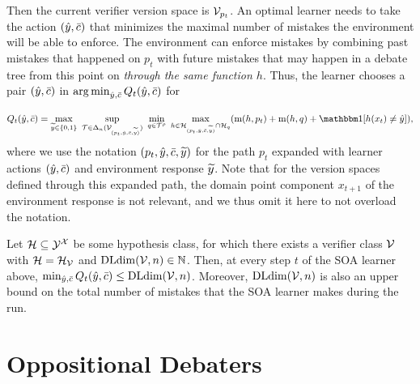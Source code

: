 \documentclass[anon]{alt2027} %
\DeclareMathOperator*{\argmin}{arg\,min}
\begin{document}
Then the current verifier version space is ${\mathcal V}_{p_t}$. 
An optimal learner needs to take the action $({\hat{y}}, \bar{c})$ that minimizes the maximal number of mistakes the environment will be able to enforce. The environment can enforce mistakes by combining past mistakes that happened on $p_t$ with future mistakes that may happen in a debate tree from this point on \emph{through the same function $h$}.
Thus, the learner chooses a pair $({\hat{y}}, \bar{c})$ in $\argmin_{\hy, \sc}Q_t(\hy, \sc)$ for

\[
Q_t(\hy, \sc) = \max_{\vy\in\{0,1\}} ~\sup_{\T\in\Delta_n(\V_{(p_t,\hy, \sc, \vy)})} ~\min_{q\in\T^\rho} ~\max_{h\in \H_{(p_t,\hy, \sc, \vy)}\cap \H_q} (\mi(h, p_t) + \mi(h,q) +\indct[h(x_t) \neq \hy]),
\]
where we use the notation $(p_t,{\hat{y}}, \bar{c}, {\widetilde{y}})$ for the path $p_t$ expanded with learner actions $({\hat{y}}, \bar{c})$ and environment response ${\widetilde{y}}$. 
Note that for the version spaces defined through this expanded path, the domain point component $x_{t+1}$ of the  environment response is not relevant, and we thus omit it here to not overload the notation.

\begin{lemma}\label{lemma:cooperative_deterministic_upperbound}
 Let ${{\mathcal H}}\subseteq {\mathcal Y}^{\mathcal X}$ be some hypothesis class, for which there exists a verifier class ${\mathcal V}$ with ${{\mathcal H}} = {{\mathcal H}}_{\mathcal V}$ and $\mathrm{DLdim}({\mathcal V}, n) \in \mathbb{N}$. Then, at every step $t$ of the SOA learner above, $\min_{{\hat{y}},\bar{c}} Q_t({\hat{y}},\bar{c}) \leq \mathrm{DLdim}({\mathcal V}, n)$. 
  Moreover, $\mathrm{DLdim}({\mathcal V}, n)$ is also an upper bound on the total number of mistakes that the SOA learner makes during the run.
\end{lemma}





\section{Oppositional Debaters}
\label{sec:oppositional}
\end{document}
